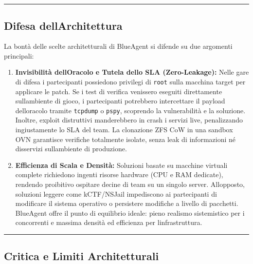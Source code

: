 \begin{center}\rule{0.5\linewidth}{0.5pt}\end{center}

\subsection{Difesa
dell\textquotesingle Architettura}\label{difesa-dellarchitettura}

La bontà delle scelte architetturali di BlueAgent si difende su due
argomenti principali:

\begin{enumerate}
\def\labelenumi{\arabic{enumi}.}
\item
  \textbf{Invisibilità dell\textquotesingle Oracolo e Tutela dello SLA
  (Zero-Leakage):} Nelle gare di difesa i partecipanti possiedono
  privilegi di \passthrough{\lstinline!root!} sulla macchina target per
  applicare le patch. Se i test di verifica venissero eseguiti
  direttamente sull\textquotesingle ambiente di gioco, i partecipanti
  potrebbero intercettare il payload dell\textquotesingle oracolo
  tramite \passthrough{\lstinline!tcpdump!} o
  \passthrough{\lstinline!pspy!}, scoprendo la vulnerabilità e la
  soluzione. Inoltre, exploit distruttivi manderebbero in crash i
  servizi live, penalizzando ingiustamente lo SLA del team. La
  clonazione ZFS CoW in una sandbox OVN garantisce verifiche totalmente
  isolate, senza leak di informazioni né disservizi
  sull\textquotesingle ambiente di produzione.
\item
  \textbf{Efficienza di Scala e Densità:} Soluzioni basate su macchine
  virtuali complete richiedono ingenti risorse hardware (CPU e RAM
  dedicate), rendendo proibitivo ospitare decine di team su un singolo
  server. All\textquotesingle opposto, soluzioni leggere come
  kCTF/NSJail impediscono ai partecipanti di modificare il sistema
  operativo o persistere modifiche a livello di pacchetti. BlueAgent
  offre il punto di equilibrio ideale: pieno realismo sistemistico per i
  concorrenti e massima densità ed efficienza per
  l\textquotesingle infrastruttura.
\end{enumerate}

\begin{center}\rule{0.5\linewidth}{0.5pt}\end{center}

\subsection{Critica e Limiti
Architetturali}\label{critica-e-limiti-architetturali}

